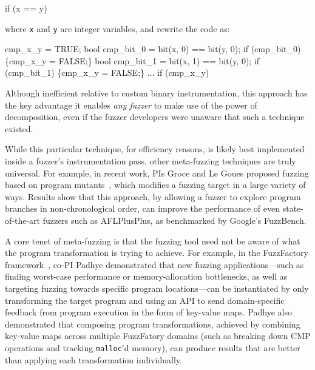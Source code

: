\begin{code}

if (x == y)
\end{code}

\noindent where {\tt x} and {\tt y} are integer variables, and rewrite the code 
as:

\begin{code}
cmp\_x\_y = TRUE;
bool cmp\_bit\_0 = bit(x, 0) == bit(y, 0);
if (cmp\_bit\_0) \{cmp\_x\_y = FALSE;\}
bool cmp\_bit\_1 = bit(x, 1) == bit(y, 0);
if (cmp\_bit\_1) \{cmp\_x\_y = FALSE;\}
$\ldots$
if (cmp\_x\_y)
\end{code}

\noindent Although inefficient relative to custom binary instrumentation, this
approach has the key advantage it enables \emph{any fuzzer} to make use of the power of 
decomposition, even if the fuzzer developers were unaware that such a technique 
existed. 

While this particular technique, for efficiency reasons, is likely best 
implemented inside a fuzzer's instrumentation pass, other meta-fuzzing 
techniques are truly universal.  For example, in recent work, PIs Groce and Le Goues 
proposed fuzzing based on program mutants~\cite{fixme}, which modifies a fuzzing 
target in a large variety of ways.  Results show that this approach, by 
allowing a fuzzer to explore program branches in non-chronological order, can 
improve the performance of even state-of-the-art fuzzers such as AFLPlusPlus, 
as benchmarked by Google's FuzzBench.

A core tenet of meta-fuzzing is that the fuzzing tool need not be aware of what 
the program transformation is trying to achieve. For example, in the 
FuzzFactory framework~\cite{fuzzfactory}, co-PI Padhye demonstrated that new 
fuzzing applications---such as finding worst-case performance or 
memory-allocation bottlenecks, as well as targeting fuzzing towards specific 
program locations---can be instantiated by only transforming the target program 
and using an API to send domain-specific feedback from program execution in the 
form of key-value maps. Padhye also demonstrated that composing program 
transformations, achieved by combining key-value maps across multiple 
FuzzFatory domains (such as breaking down CMP operations and tracking 
\texttt{malloc}'d memory), can produce results that are better than applying 
each transformation individually.

